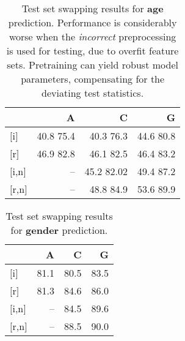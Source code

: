 \documentclass[10pt,twocolumn,letterpaper]{article}
\begin{document}

\begin{table}
\begin{center}
\begin{tabular}{l|rrr}
	& \textbf{A} & \textbf{C} & \textbf{G}\\
\hline
	 $[$i$]$ 		& 40.8 \tiny{75.4}	& 40.3 \tiny{76.3}	& 44.6 \tiny{80.8}	\\
	 $[$r$]$ 		& 46.9	\tiny{82.8} & 46.1	\tiny{82.5} & 46.4	\tiny{83.2}  \\
	 \hline
	 $[$i,n$]$ 	& --  	& 45.2 \tiny{82.02}	& 49.4 \tiny{87.2}	\\
	 $[$r,n$]$ 	& -- 	& 48.8 \tiny{84.9} 	& 53.6 \tiny{89.9}	\\
\hline
\end{tabular}
\end{center}
	\caption{
	Test set swapping results for \textbf{age} prediction.
	Performance is considerably worse when the \textit{incorrect} preprocessing is used for testing, due to overfit feature sets. Pretraining can yield robust model parameters, compensating for the deviating test statistics.
	}
	\label{tab:ageresultsopposite}
\end{table}

\begin{table}
\begin{center}
\begin{tabular}{l|rrr}
	& \textbf{A} & \textbf{C} & \textbf{G}\\
\hline
	 $[$i$]$ 		& 81.1	& 80.5	& 83.5\\
	 $[$r$]$ 		& 81.3 	& 84.6 	& 86.0\\
	 \hline
	 $[$i,n$]$ 	& -- 	& 84.5 	& 89.6 \\
	 $[$r,n$]$ 	& --	& 88.5 	& 90.0 \\
\hline
\end{tabular}
\end{center}
	\caption{
	Test set swapping results for \textbf{gender} prediction.
	}
	\label{tab:genderresultsopposite}
\end{table}
\end{document}
